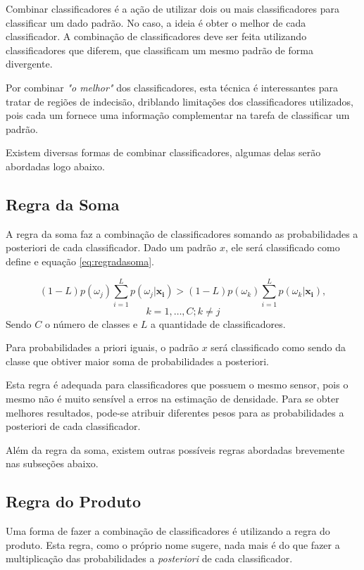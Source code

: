Combinar classificadores é a ação de utilizar dois ou mais classificadores para classificar um dado padrão. No caso, a ideia é obter o melhor de cada classificador. A combinação de classificadores deve ser feita utilizando classificadores que diferem, que classificam um mesmo padrão de forma divergente.

Por combinar \textit{"o melhor"} dos classificadores, esta técnica é interessantes para tratar de regiões de indecisão, driblando limitações dos classificadores utilizados, pois cada um fornece uma informação complementar na tarefa de classificar um padrão.

Existem diversas formas de combinar classificadores, algumas delas serão abordadas logo abaixo.


\subsection{Regra da Soma}
\label{subsubsec:regradasoma}

A regra da soma faz a combinação de classificadores somando as probabilidades a posteriori de cada classificador. Dado um padrão $x$, ele será classificado como define e equação \ref{eq:regradasoma}.

\begin{equation}
\label{eq:regradasoma}
(1 - L) p(\omega_j) \sum_{i = 1}^{L} p(\omega_j | \mathbf{x_i}) > (1 - L) p(\omega_k) \sum_{i = 1}^{L} p(\omega_k | \mathbf{x_i}),
\end{equation}
\[k = 1, \ldots, C;     k \ne j \] Sendo $C$ o número de classes e $L$ a quantidade de classificadores.

Para probabilidades a priori iguais, o padrão $x$ será classificado como sendo da classe que obtiver maior soma de probabilidades a posteriori.

Esta regra é adequada para classificadores que possuem o mesmo sensor, pois o mesmo não é muito sensível a erros na estimação de densidade. Para se obter melhores resultados, pode-se atribuir diferentes pesos para as probabilidades a posteriori de cada classificador.

Além da regra da soma, existem outras possíveis regras abordadas brevemente nas subseções abaixo.

\subsection{Regra do Produto}
\label{subsubsec:regradoproduto}

Uma forma de fazer a combinação de classificadores é utilizando a regra do produto. Esta regra, como o próprio nome sugere, nada mais é do que fazer a multiplicação das probabilidades a \textit{posteriori} de cada classificador.

